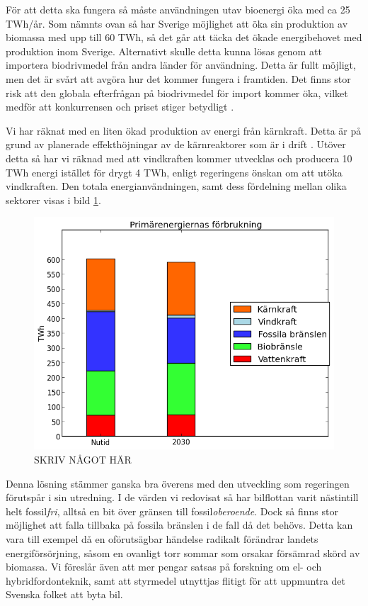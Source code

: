\documentclass[a4paper,11pt,fleqn, titlepage]{article}
\begin{document}
För att detta ska fungera så måste användningen utav bioenergi öka med ca
25 TWh/år. Som nämnts ovan så har Sverige möjlighet att öka sin produktion
av biomassa med upp till 60 TWh, så det går att täcka det ökade
energibehovet med produktion inom Sverige. Alternativt skulle detta kunna
lösas genom att importera biodrivmedel från andra länder för användning.
Detta är fullt möjligt, men det är svårt att avgöra hur det kommer fungera
i framtiden. Det finns stor risk att den globala efterfrågan på
biodrivmedel för import kommer öka, vilket medför att konkurrensen och
priset stiger betydligt \cite{fossilfrihet}.

Vi har räknat med en liten ökad produktion av energi från kärnkraft. Detta
är på grund av planerade effekthöjningar av de kärnreaktorer som är i
drift \cite{energimyndigheten}. Utöver detta så har vi räknad med att
vindkraften kommer utvecklas och producera 10 TWh energi istället för drygt
4 TWh, enligt regeringens önskan om att utöka vindkraften. Den totala
energianvändningen, samt dess fördelning mellan olika sektorer visas 
i bild \ref{fig:scen1a1energidiagram}.

\begin{figure}[h!]
       \centering
       \includegraphics[scale=0.7]{scen1a1energidiagram.png}
       \caption{SKRIV NÅGOT HÄR}
       \label{fig:scen1a1energidiagram}
\end{figure}

Denna lösning stämmer ganska bra överens med den utveckling som regeringen förutspår i sin utredning. I de värden vi redovisat så har bilflottan varit nästintill helt fossil\textit{fri}, alltså en bit över gränsen till fossil\textit{oberoende}. Dock så finns stor möjlighet att falla tillbaka på fossila bränslen i de fall då det behövs. Detta kan vara till exempel då en oförutsägbar händelse radikalt förändrar landets energiförsörjning, såsom en ovanligt torr sommar som orsakar försämrad skörd av biomassa. Vi föreslår även att mer pengar satsas på forskning om el- och hybridfordonteknik, samt att styrmedel utnyttjas flitigt för att uppmuntra det Svenska folket att byta bil.
\end{document}

